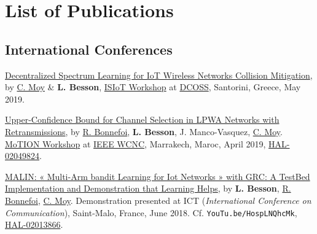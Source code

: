 \chapter*{List of Publications}




\section*{International Conferences}
\renewcommand{\labelenumi}{[IC-\arabic{enumi}]}
\begin{etaremune}
\item
  \href{https://hal.inria.fr/hal-XXX/document}{Decentralized Spectrum Learning for IoT Wireless Networks Collision Mitigation}, by \href{https://moychris.wordpress.com/}{C. Moy} \& \textbf{L. Besson},
  \href{https://sites.google.com/view/ISIoT2019/}{ISIoT Workshop} at \href{https://dcoss.org/}{DCOSS}, Santorini, Greece, May 2019.
  \cite{MoyBesson2019}
\item
  \href{https://perso.crans.org/besson/articles/BMBBM__IEEE_WCNC__2019.pdf}{Upper-Confidence
  Bound for Channel Selection in LPWA Networks with Retransmissions},
  by \href{https://remibonnefoi.wordpress.com/}{R. Bonnefoi}, \textbf{L. Besson}, J.
  Manco-Vasquez,
  \href{https://moychris.wordpress.com/}{C. Moy}.
  \href{https://sites.google.com/view/wcncworkshop-motion2019/}{MoTION Workshop} at
  \href{http://wcnc2019.ieee-wcnc.org/}{IEEE WCNC},
  Marrakech, Maroc, April 2019, \href{https://hal.inria.fr/hal-02049824}{HAL-02049824}.
  \cite{Bonnefoi2019WCNC}
\item
  \href{https://perso.crans.org/besson/articles/BBM__Demo_ICT_2018.pdf}{MALIN:
  « Multi-Arm bandit Learning for Iot Networks » with GRC: A TestBed
  Implementation and Demonstration that Learning Helps}, by \textbf{L.
  Besson}, \href{https://remibonnefoi.wordpress.com/}{R. Bonnefoi},
  \href{https://moychris.wordpress.com/}{C. Moy}. Demonstration
  presented at ICT (\emph{International Conference on Communication}),
  Saint-Malo, France, June 2018. Cf. \texttt{YouTu.be/HospLNQhcMk}, \href{https://hal.inria.fr/hal-02013866}{HAL-02013866}.
  \cite{Besson2018ICT}
\end{etaremune}


